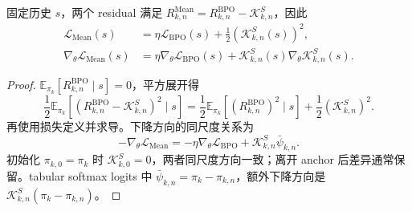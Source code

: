 \begin{proposition}
\label{prop:ch2-mean-bpo-gap}
固定历史 $s$，两个 residual 满足 $R_{k,n}^{\mathrm{Mean}}=R_{k,n}^{\mathrm{BPO}}-\mathcal K_{k,n}^{S}$，因此
\begin{align}
\mathcal L_{\mathrm{Mean}}(s)&=\eta\mathcal L_{\mathrm{BPO}}(s)+\frac12(\mathcal K_{k,n}^{S}(s))^2,\\
\nabla_\theta\mathcal L_{\mathrm{Mean}}(s)&=\eta\nabla_\theta\mathcal L_{\mathrm{BPO}}(s)+\mathcal K_{k,n}^{S}(s)\nabla_\theta\mathcal K_{k,n}^{S}(s).
\label{eq:ch2-mean-bpo-gap}
\end{align}
\end{proposition}
\begin{proof}
$\mathbb E_{\pi_k}[R_{k,n}^{\mathrm{BPO}}\mid s]=0$，平方展开得
\[
\frac12\mathbb E_{\pi_k}[(R_{k,n}^{\mathrm{BPO}}-\mathcal K_{k,n}^{S})^2\mid s]
=\frac12\mathbb E_{\pi_k}[(R_{k,n}^{\mathrm{BPO}})^2\mid s]+\frac12(\mathcal K_{k,n}^{S})^2.
\]
再使用损失定义并求导。下降方向的同尺度关系为
\[
-\nabla_\theta\mathcal L_{\mathrm{Mean}}
=-\eta\nabla_\theta\mathcal L_{\mathrm{BPO}}+\mathcal K_{k,n}^{S}\bar\psi_{k,n}.
\]
初始化 $\pi_{k,0}=\pi_k$ 时 $\mathcal K_{k,0}^{S}=0$，两者同尺度方向一致；离开 anchor 后差异通常保留。tabular softmax logits 中 $\bar\psi_{k,n}=\pi_k-\pi_{k,n}$，额外下降方向是 $\mathcal K_{k,n}^{S}(\pi_k-\pi_{k,n})$。
\end{proof}

